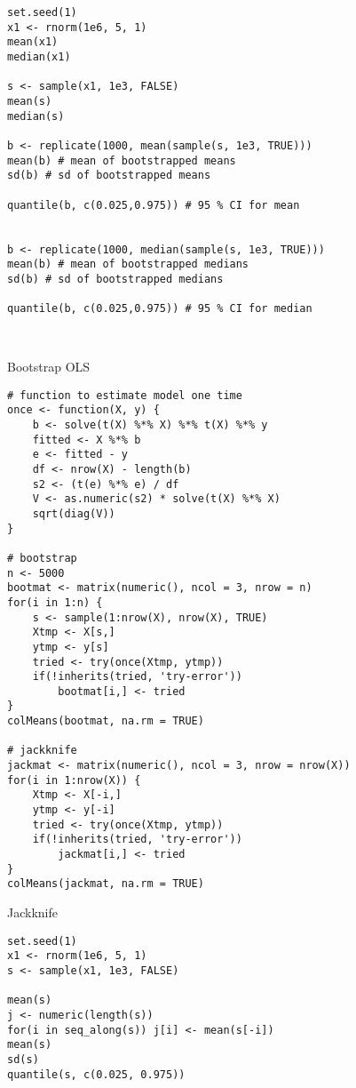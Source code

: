 \documentclass[a4paper,12pt]{article}
\begin{document}
\begin{lstlisting}
set.seed(1)
x1 <- rnorm(1e6, 5, 1)
mean(x1)
median(x1)

s <- sample(x1, 1e3, FALSE)
mean(s)
median(s)

b <- replicate(1000, mean(sample(s, 1e3, TRUE)))
mean(b) # mean of bootstrapped means
sd(b) # sd of bootstrapped means

quantile(b, c(0.025,0.975)) # 95 % CI for mean


b <- replicate(1000, median(sample(s, 1e3, TRUE)))
mean(b) # mean of bootstrapped medians
sd(b) # sd of bootstrapped medians

quantile(b, c(0.025,0.975)) # 95 % CI for median



\end{lstlisting}






Bootstrap OLS

\begin{lstlisting}
# function to estimate model one time
once <- function(X, y) {
    b <- solve(t(X) %*% X) %*% t(X) %*% y
    fitted <- X %*% b
    e <- fitted - y
    df <- nrow(X) - length(b)
    s2 <- (t(e) %*% e) / df
    V <- as.numeric(s2) * solve(t(X) %*% X)
    sqrt(diag(V))
}

# bootstrap
n <- 5000
bootmat <- matrix(numeric(), ncol = 3, nrow = n)
for(i in 1:n) {
    s <- sample(1:nrow(X), nrow(X), TRUE)
    Xtmp <- X[s,]
    ytmp <- y[s]
    tried <- try(once(Xtmp, ytmp))
    if(!inherits(tried, 'try-error'))
        bootmat[i,] <- tried
}
colMeans(bootmat, na.rm = TRUE)

# jackknife
jackmat <- matrix(numeric(), ncol = 3, nrow = nrow(X))
for(i in 1:nrow(X)) {
    Xtmp <- X[-i,]
    ytmp <- y[-i]
    tried <- try(once(Xtmp, ytmp))
    if(!inherits(tried, 'try-error'))
        jackmat[i,] <- tried
}
colMeans(jackmat, na.rm = TRUE)
\end{lstlisting}
















Jackknife

\begin{lstlisting}
set.seed(1)
x1 <- rnorm(1e6, 5, 1)
s <- sample(x1, 1e3, FALSE)

mean(s)
j <- numeric(length(s))
for(i in seq_along(s)) j[i] <- mean(s[-i])
mean(s)
sd(s)
quantile(s, c(0.025, 0.975))

\end{lstlisting}
\end{document}
